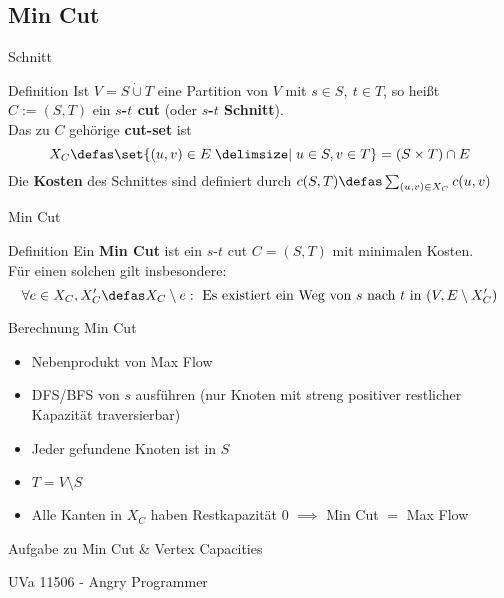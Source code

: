 \subsection{Min Cut}
\begin{frame}{Schnitt}
    \begin{block}{Definition}
        \pause Ist \(V = S \dot{\cup} T\) eine Partition von \(V\) mit \(s \in S, \ t \in T\), so heißt \(C := (S, T)\) ein \textbf{$s$-$t$ cut} (oder \textbf{$s$-$t$ Schnitt}).\\\pause
        Das zu $C$ gehörige \textbf{cut-set} ist
        \[X_C \defas \set{(u, v) \in E \given u \in S, v \in T} = (S\times
        T)\cap E\]
        \pause
        Die \textbf{Kosten} des Schnittes sind definiert durch
        \(c(S, T) \defas \sum\nolimits_{(u, v) \in X_C} c(u, v)\)
    \end{block}
\end{frame}

\begin{frame}{Min Cut}
    \begin{block}{Definition}
        \pause Ein \textbf{Min Cut} ist ein $s$-$t$ cut \(C = (S, T)\) mit minimalen Kosten.\\\pause
        Für einen solchen gilt insbesondere:
        \[\forall e \in X_C, X_C' \defas X_C \setminus e :
        \text{ Es existiert ein Weg von $s$ nach $t$ in } (V, E \setminus X_C')\]
    \end{block}
\end{frame}

\begin{frame}{Berechnung Min Cut}
    \begin{itemize}
        \item Nebenprodukt von Max Flow
        \pause\item DFS/BFS von $s$ ausführen (nur Knoten mit streng positiver restlicher Kapazität
        traversierbar)
        \pause\item Jeder gefundene Knoten ist in $S$
        \pause\item \(T = V\setminus S\)
        \pause\item Alle Kanten in $X_C$ haben Restkapazität $0$ \(\implies\) Min
        Cut $=$ Max Flow
    \end{itemize}
\end{frame}

\begin{frame}{Aufgabe zu Min Cut \& Vertex Capacities}
    \begin{block}{UVa 11506 - Angry Programmer}

    \end{block}

\end{frame}